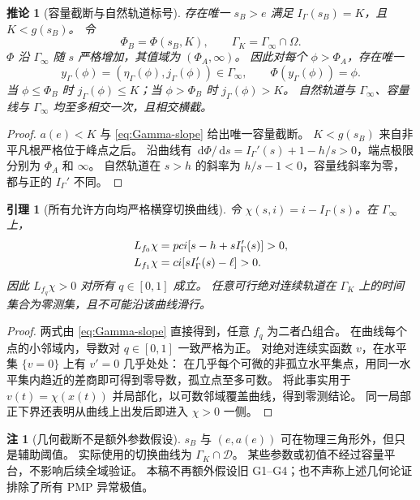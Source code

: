\documentclass[11pt,a4paper,UTF8]{ctexart}
\newtheorem{lemma}[theorem]{引理}
\newtheorem{corollary}[theorem]{推论}
\theoremstyle{definition}
\newtheorem{remark}[theorem]{注}
\newcommand{\Dcal}{\mathcal D}
\newcommand{\dd}{\,\mathrm d}
\begin{document}
\begin{corollary}[容量截断与自然轨道标号]
\label{cor:Gamma-labels}
存在唯一 $s_B>e$ 满足 $I_\Gamma(s_B)=K$，且 $K<g(s_B)$。
令
\begin{equation}
\Phi_B=\Phi(s_B,K),\qquad \Gamma_K=\Gamma_\infty\cap\Omega.
\label{eq:PhiB}
\end{equation}
$\Phi$ 沿 $\Gamma_\infty$ 随 $s$ 严格增加，其值域为 $(\Phi_A,\infty)$。
因此对每个 $\phi>\Phi_A$，存在唯一
\begin{equation}
y_\Gamma(\phi)=(\eta_\Gamma(\phi),j_\Gamma(\phi))\in\Gamma_\infty,
\qquad \Phi(y_\Gamma(\phi))=\phi.
\label{eq:Gamma-hit-map}
\end{equation}
当 $\phi\le\Phi_B$ 时 $j_\Gamma(\phi)\le K$；当 $\phi>\Phi_B$ 时 $j_\Gamma(\phi)>K$。
自然轨道与 $\Gamma_\infty$、容量线与 $\Gamma_\infty$ 均至多相交一次，且相交横截。
\end{corollary}
\begin{proof}
$a(e)<K$ 与 \eqref{eq:Gamma-slope} 给出唯一容量截断。
$K<g(s_B)$ 来自非平凡根严格位于峰点之后。
沿曲线有 $\dd\Phi/\dd s=I_\Gamma'(s)+1-h/s>0$，端点极限分别为 $\Phi_A$ 和 $\infty$。
自然轨道在 $s>h$ 的斜率为 $h/s-1<0$，容量线斜率为零，都与正的 $I_\Gamma'$ 不同。
\end{proof}

\begin{lemma}[所有允许方向均严格横穿切换曲线]
\label{lem:strict-crossing}
令 $\chi(s,i)=i-I_\Gamma(s)$。在 $\Gamma_\infty$ 上，
\begin{align}
L_{f_0}\chi&=pci[s-h+sI_\Gamma'(s)]>0,\notag\\
L_{f_1}\chi&=ci[sI_\Gamma'(s)-\ell]>0.\label{eq:strict-crossing}
\end{align}
因此 $L_{f_q}\chi>0$ 对所有 $q\in[0,1]$ 成立。
任意可行绝对连续轨道在 $\Gamma_K$ 上的时间集合为零测集，且不可能沿该曲线滑行。
\end{lemma}
\begin{proof}
两式由 \eqref{eq:Gamma-slope} 直接得到，任意 $f_q$ 为二者凸组合。
在曲线每个点的小邻域内，导数对 $q\in[0,1]$ 一致严格为正。
对绝对连续实函数 $v$，在水平集 $\{v=0\}$ 上有 $v'=0$ 几乎处处：
在几乎每个可微的非孤立水平集点，用同一水平集内趋近的差商即可得到零导数，孤立点至多可数。
将此事实用于 $v(t)=\chi(x(t))$ 并局部化，以可数邻域覆盖曲线，得到零测结论。
同一局部正下界还表明从曲线上出发后即进入 $\chi>0$ 一侧。
\end{proof}

\begin{remark}[几何截断不是额外参数假设]
$s_B$ 与 $(e,a(e))$ 可在物理三角形外，但只是辅助阈值。
实际使用的切换曲线为 $\Gamma_K\cap\Dcal$。
某些参数或初值不经过容量平台，不影响后续全域验证。
本稿不再额外假设旧 G1--G4；也不声称上述几何论证排除了所有 PMP 异常极值。
\end{remark}
\end{document}
